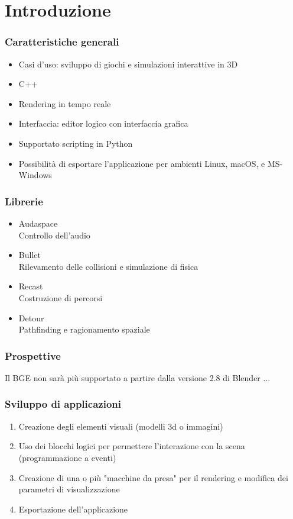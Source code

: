 \documentclass{beamer}
\begin{document}
	\section{Introduzione}
		\begin{frame}
			\frametitle{Caratteristiche generali}
			\begin{itemize}
				\item Casi d'uso: sviluppo di giochi e simulazioni interattive in 3D 
				\item C++
				\item Rendering in tempo reale
				\item Interfaccia: editor logico con interfaccia grafica 
				\item Supportato scripting in Python
				\item Possibilità di esportare l'applicazione per ambienti Linux, macOS, e MS-Windows
			\end{itemize}
		\end{frame}
		\begin{frame}
			\frametitle{Librerie}
			\begin{itemize}
				\item Audaspace \\ {\footnotesize\hspace{1em} Controllo dell'audio}
				\item Bullet \\ {\footnotesize\hspace{1em} Rilevamento delle collisioni e simulazione di fisica} 
				\item Recast \\ {\footnotesize\hspace{1em} Costruzione di percorsi}
				\item Detour \\ {\footnotesize\hspace{1em} Pathfinding e ragionamento spaziale}
			\end{itemize}
		\end{frame}
		\begin{frame}
			\frametitle{Prospettive}
			\textcolor{BlenderOrange}{Il BGE non sarà più supportato a partire dalla versione 2.8 di Blender}
			...
		\end{frame}
		\begin{frame}
			\frametitle{Sviluppo di applicazioni}
			\begin{enumerate}
				\item Creazione degli elementi visuali (modelli 3d o immagini)
				\item Uso dei blocchi logici per permettere l'interazione con la scena (programmazione a eventi)
				\item Creazione di una o più "macchine da presa" per il rendering e modifica dei parametri di visualizzazione
				\item Esportazione dell'applicazione
			\end{enumerate}
		\end{frame}
	
\end{document}
